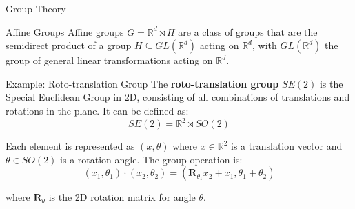 \documentclass[9pt,dvipsnames]{beamer}
\begin{document}
\begin{frame}{Group Theory}

	\begin{block}{Affine Groups}
		Affine groups $G = \mathbb{R}^d \rtimes H$ are a class of groups that are the semidirect product of a group $H \subseteq GL(\mathbb{R}^d)$ acting on $\mathbb{R}^d$, with $GL(\mathbb{R}^d)$ the group of general linear transformations acting on $\mathbb{R}^d$.
	\end{block}

	\begin{block}{Example: Roto-translation Group}
		The \textbf{roto-translation group} $SE(2)$ is the Special Euclidean Group in 2D, consisting of all combinations of translations and rotations in the plane. It can be defined as:
		\begin{equation*}
			SE(2) = \mathbb{R}^2 \rtimes SO(2)
		\end{equation*}

		Each element is represented as $(x, \theta)$ where $x \in \mathbb{R}^2$ is a translation vector and $\theta \in SO(2)$ is a rotation angle. The group operation is:
		\begin{equation*}
			(x_1, \theta_1) \cdot (x_2, \theta_2) = (\mathbf{R}_{\theta_1} x_2 + x_1, \theta_1 + \theta_2)
		\end{equation*}

		where $\mathbf{R}_{\theta}$ is the 2D rotation matrix for angle $\theta$.
	\end{block}

\end{frame}
\end{document}
